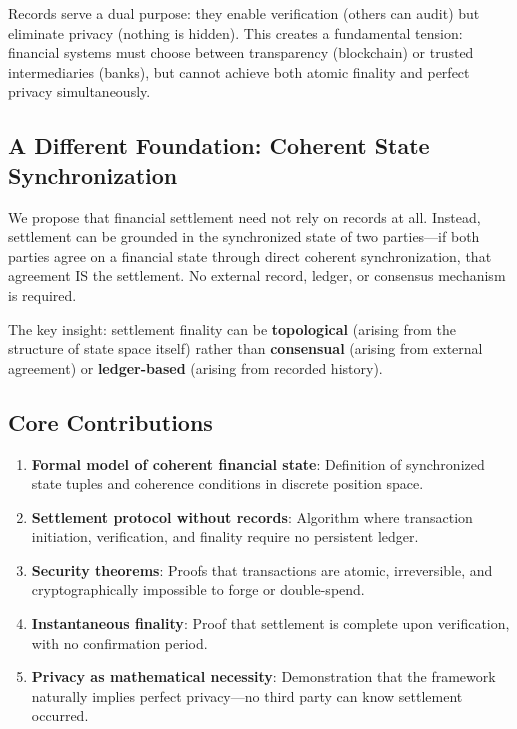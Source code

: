 \documentclass[twocolumn,10pt,a4paper]{article}
\theoremstyle{plain}
\theoremstyle{definition}
\begin{document}
Records serve a dual purpose: they enable verification (others can audit) but eliminate privacy (nothing is hidden). This creates a fundamental tension: financial systems must choose between transparency (blockchain) or trusted intermediaries (banks), but cannot achieve both atomic finality and perfect privacy simultaneously.

\subsection{A Different Foundation: Coherent State Synchronization}

We propose that financial settlement need not rely on records at all. Instead, settlement can be grounded in the synchronized state of two parties—if both parties agree on a financial state through direct coherent synchronization, that agreement IS the settlement. No external record, ledger, or consensus mechanism is required.

The key insight: settlement finality can be \textbf{topological} (arising from the structure of state space itself) rather than \textbf{consensual} (arising from external agreement) or \textbf{ledger-based} (arising from recorded history).

\subsection{Core Contributions}

\begin{enumerate}
\item \textbf{Formal model of coherent financial state}: Definition of synchronized state tuples and coherence conditions in discrete position space.

\item \textbf{Settlement protocol without records}: Algorithm where transaction initiation, verification, and finality require no persistent ledger.

\item \textbf{Security theorems}: Proofs that transactions are atomic, irreversible, and cryptographically impossible to forge or double-spend.

\item \textbf{Instantaneous finality}: Proof that settlement is complete upon verification, with no confirmation period.

\item \textbf{Privacy as mathematical necessity}: Demonstration that the framework naturally implies perfect privacy—no third party can know settlement occurred.
\end{enumerate}
\end{document}
